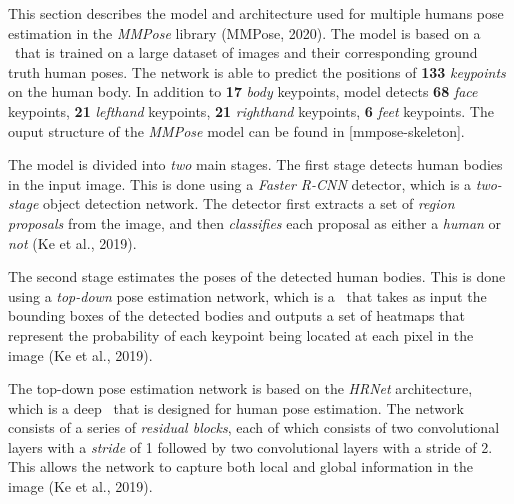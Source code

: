 
This section describes the model and architecture used for multiple humans pose estimation in the {\em MMPose} library (\scc MMPose, 2020). The model is based on a \CNN\ that is trained on a large dataset of images and their corresponding ground truth human poses. The network is able to predict the positions of {\bf 133} {\em keypoints} on the human body. In addition to {\bf 17} {\em body} keypoints, model detects {\bf 68} {\em face} keypoints, {\bf 21} {\em lefthand} keypoints, {\bf 21} {\em righthand} keypoints, {\bf 6} {\em feet} keypoints. The ouput structure of the {\em MMPose} model can be found in [mmpose-skeleton].

The model is divided into {\em two} main stages. The first stage detects human bodies in the input image. This is done using a {\em Faster R-CNN} detector, which is a {\em two-stage} object detection network. The detector first extracts a set of {\em region proposals} from the image, and then {\em classifies} each proposal as either a {\em human} or {\em not} (\scc Ke et al., 2019).

The second stage estimates the poses of the detected human bodies. This is done using a {\em top-down} pose estimation network, which is a \CNN\ that takes as input the bounding boxes of the detected bodies and outputs a set of heatmaps that represent the probability of each keypoint being located at each pixel in the image (\scc Ke et al., 2019).

The top-down pose estimation network is based on the {\em HRNet} architecture, which is a deep \CNN\ that is designed for human pose estimation. The network consists of a series of {\em residual blocks}, each of which consists of two convolutional layers with a {\em stride} of 1 followed by two convolutional layers with a stride of 2. This allows the network to capture both local and global information in the image (\scc Ke et al., 2019).

